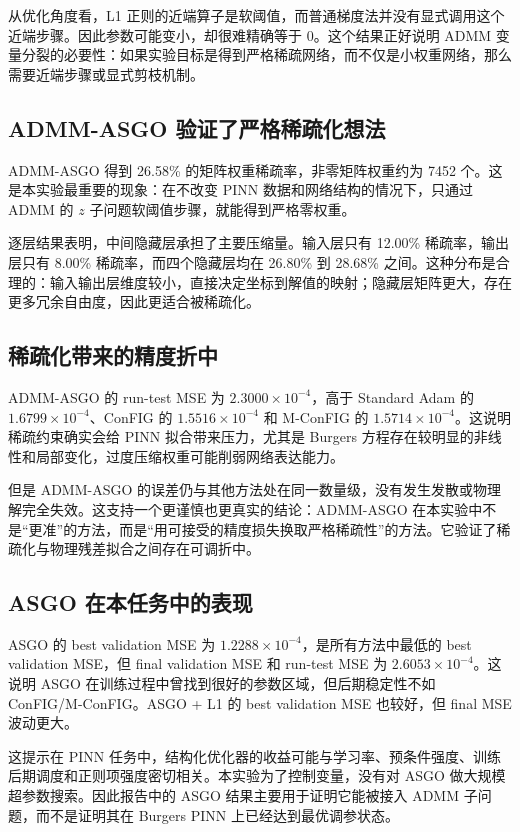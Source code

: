 \documentclass[UTF8,a4paper,12pt,fontset=none]{ctexart}
\begin{document}
从优化角度看，L1 正则的近端算子是软阈值，而普通梯度法并没有显式调用这个近端步骤。因此参数可能变小，却很难精确等于 0。这个结果正好说明 ADMM 变量分裂的必要性：如果实验目标是得到严格稀疏网络，而不仅是小权重网络，那么需要近端步骤或显式剪枝机制。

\subsection{ADMM-ASGO 验证了严格稀疏化想法}

ADMM-ASGO 得到 26.58\% 的矩阵权重稀疏率，非零矩阵权重约为 7452 个。这是本实验最重要的现象：在不改变 PINN 数据和网络结构的情况下，只通过 ADMM 的 $z$ 子问题软阈值步骤，就能得到严格零权重。

逐层结果表明，中间隐藏层承担了主要压缩量。输入层只有 12.00\% 稀疏率，输出层只有 8.00\% 稀疏率，而四个隐藏层均在 26.80\% 到 28.68\% 之间。这种分布是合理的：输入输出层维度较小，直接决定坐标到解值的映射；隐藏层矩阵更大，存在更多冗余自由度，因此更适合被稀疏化。

\subsection{稀疏化带来的精度折中}

ADMM-ASGO 的 run-test MSE 为 $2.3000\times 10^{-4}$，高于 Standard Adam 的 $1.6799\times 10^{-4}$、ConFIG 的 $1.5516\times 10^{-4}$ 和 M-ConFIG 的 $1.5714\times 10^{-4}$。这说明稀疏约束确实会给 PINN 拟合带来压力，尤其是 Burgers 方程存在较明显的非线性和局部变化，过度压缩权重可能削弱网络表达能力。

但是 ADMM-ASGO 的误差仍与其他方法处在同一数量级，没有发生发散或物理解完全失效。这支持一个更谨慎也更真实的结论：ADMM-ASGO 在本实验中不是“更准”的方法，而是“用可接受的精度损失换取严格稀疏性”的方法。它验证了稀疏化与物理残差拟合之间存在可调折中。

\subsection{ASGO 在本任务中的表现}

ASGO 的 best validation MSE 为 $1.2288\times 10^{-4}$，是所有方法中最低的 best validation MSE，但 final validation MSE 和 run-test MSE 为 $2.6053\times 10^{-4}$。这说明 ASGO 在训练过程中曾找到很好的参数区域，但后期稳定性不如 ConFIG/M-ConFIG。ASGO + L1 的 best validation MSE 也较好，但 final MSE 波动更大。

这提示在 PINN 任务中，结构化优化器的收益可能与学习率、预条件强度、训练后期调度和正则项强度密切相关。本实验为了控制变量，没有对 ASGO 做大规模超参数搜索。因此报告中的 ASGO 结果主要用于证明它能被接入 ADMM 子问题，而不是证明其在 Burgers PINN 上已经达到最优调参状态。
\end{document}
